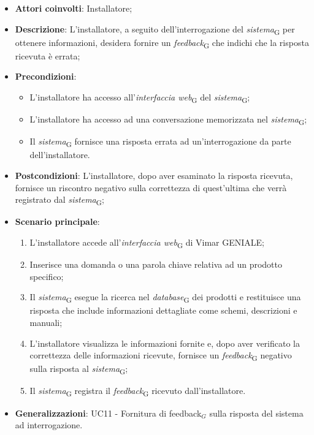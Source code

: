 \begin{itemize}
    \item \textbf{Attori coinvolti}: Installatore;
    \item \textbf{Descrizione}: L’installatore, a seguito dell’interrogazione del \textit{sistema}\textsubscript{G} per ottenere informazioni, desidera fornire un \textit{feedback}\textsubscript{G} che indichi che la risposta ricevuta è errata;
    \item \textbf{Precondizioni}: 
        \begin{itemize}
            \item L’installatore ha accesso all’\textit{interfaccia web}\textsubscript{G} del \textit{sistema}\textsubscript{G};
            \item L’installatore ha accesso ad una conversazione memorizzata nel \textit{sistema}\textsubscript{G};
            \item Il \textit{sistema}\textsubscript{G} fornisce una risposta errata ad un’interrogazione da parte dell’installatore.
        \end{itemize}
    \item \textbf{Postcondizioni}: L’installatore, dopo aver esaminato la risposta ricevuta, fornisce un riscontro negativo sulla correttezza di quest’ultima che verrà registrato dal \textit{sistema}\textsubscript{G};
    \item \textbf{Scenario principale}:
    \begin{enumerate}
    \item L’installatore accede all’\textit{interfaccia web}\textsubscript{G} di Vimar GENIALE;
    \item Inserisce una domanda o una parola chiave relativa ad un prodotto specifico;
    \item Il \textit{sistema}\textsubscript{G} esegue la ricerca nel \textit{database}\textsubscript{G} dei prodotti e restituisce una risposta che include informazioni dettagliate come schemi, descrizioni e manuali;
    \item L’installatore visualizza le informazioni fornite e, dopo aver verificato la correttezza delle informazioni ricevute, fornisce un \textit{feedback}\textsubscript{G} negativo sulla risposta al \textit{sistema}\textsubscript{G};
    \item Il \textit{sistema}\textsubscript{G} registra il \textit{feedback}\textsubscript{G} ricevuto dall’installatore.
    \end{enumerate}
    \item \textbf{Generalizzazioni}: UC11 - Fornitura di feedback$_G$ sulla risposta del sistema ad interrogazione.

\end{itemize}

